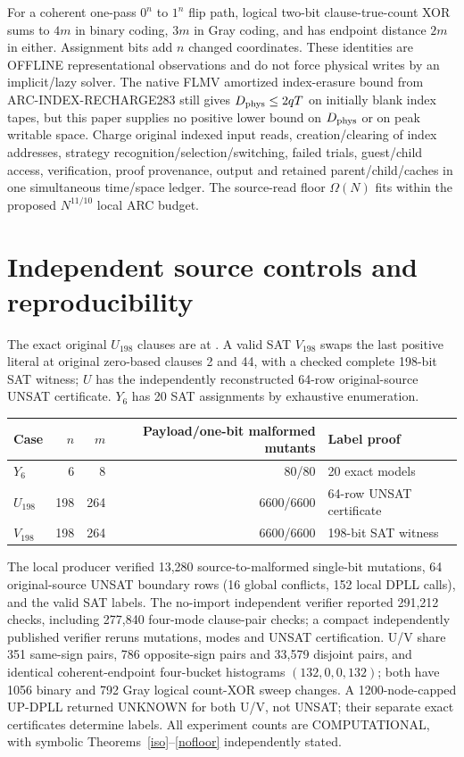 \documentclass[11pt]{article}
\begin{document}
For a coherent one-pass \(0^n\) to \(1^n\) flip path, logical two-bit clause-true-count XOR sums to \(4m\) in binary coding, \(3m\) in Gray coding, and has endpoint distance \(2m\) in either. Assignment bits add \(n\) changed coordinates. These identities are OFFLINE representational observations and do not force physical writes by an implicit/lazy solver. The native FLMV amortized index-erasure bound from ARC-INDEX-RECHARGE283 still gives \(D_{\rm phys}\le2qT\) on initially blank index tapes, but this paper supplies no positive lower bound on \(D_{\rm phys}\) or on peak writable space. Charge original indexed input reads, creation/clearing of index addresses, strategy recognition/selection/switching, failed trials, guest/child access, verification, proof provenance, output and retained parent/child/caches in one simultaneous time/space ledger. The source-read floor \(\Omega(N)\) fits within the proposed \(N^{11/10}\) local ARC budget.

\section{Independent source controls and reproducibility}
The exact original \(U_{198}\) clauses are at . A valid SAT \(V_{198}\) swaps the last positive literal at original zero-based clauses 2 and 44, with a checked complete 198-bit SAT witness; \(U\) has the independently reconstructed 64-row original-source UNSAT certificate. \(Y_6\) has 20 SAT assignments by exhaustive enumeration.
\begin{center}\begin{tabular}{lrrrl}
\toprule
Case&\(n\)&\(m\)&Payload/one-bit malformed mutants&Label proof\\
\midrule
\(Y_6\)&6&8&80/80&20 exact models\\
\(U_{198}\)&198&264&6600/6600&64-row UNSAT certificate\\
\(V_{198}\)&198&264&6600/6600&198-bit SAT witness\\
\bottomrule
\end{tabular}\end{center}
The local producer verified 13,280 source-to-malformed single-bit mutations, 64 original-source UNSAT boundary rows (16 global conflicts, 152 local DPLL calls), and the valid SAT labels. The no-import independent verifier reported 291,212 checks, including 277,840 four-mode clause-pair checks; a compact independently published verifier reruns mutations, modes and UNSAT certification. U/V share 351 same-sign pairs, 786 opposite-sign pairs and 33,579 disjoint pairs, and identical coherent-endpoint four-bucket histograms \((132,0,0,132)\); both have 1056 binary and 792 Gray logical count-XOR sweep changes. A 1200-node-capped UP-DPLL returned UNKNOWN for both U/V, not UNSAT; their separate exact certificates determine labels. All experiment counts are COMPUTATIONAL, with symbolic Theorems~\ref{iso}--\ref{nofloor} independently stated.
\end{document}
